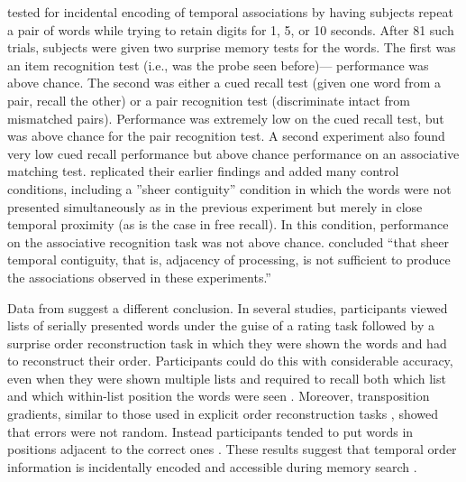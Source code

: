 \documentclass[man,natbib,floatsintext]{apa6} %
\begin{document}
\citet{GlenBrad79} tested for incidental encoding of temporal associations by having subjects repeat a pair of words while trying to retain digits for 1, 5, or 10 seconds. After 81 such trials, subjects were given two surprise memory tests for the words. The first was an item recognition test (i.e., was the probe seen before)--- performance was above chance. The second was either a cued recall test (given one word from a pair, recall the other) or a pair recognition test (discriminate intact from mismatched pairs). Performance was extremely low on the cued recall test, but was above chance for the pair recognition test. A second experiment also found very low cued recall performance but above chance performance on an associative matching test. \citet{BradGlen83} replicated their earlier findings and added many control conditions, including a ''sheer contiguity'' condition in which the words were not presented simultaneously as in the previous experiment but merely in close temporal proximity (as is the case in free recall). In this condition, performance on the associative recognition task was not above chance. \citet[][p. 665]{BradGlen83} concluded ``that sheer temporal contiguity, that is, adjacency of processing, is not sufficient to produce the associations observed in these experiments.'' 




Data from \citet{Nair91, Nair90b} suggest a different conclusion. In several studies, participants viewed lists of serially presented words under the guise of a rating task followed by a surprise order reconstruction task in which they were shown the words and had to reconstruct their order. Participants could do this with considerable accuracy, even when they were shown multiple lists and required to recall both which list and which within-list position the words were seen \citet{Nair91}. Moreover, transposition gradients, similar to those used in explicit order reconstruction tasks \cite{Heal74}, showed that errors were not random. Instead participants tended to put words in positions adjacent to the correct ones \citet{Nair91}. These results suggest that temporal order information is incidentally encoded and accessible during memory search \citep[but see][for a different prespective]{Hint16}. 
\end{document}
